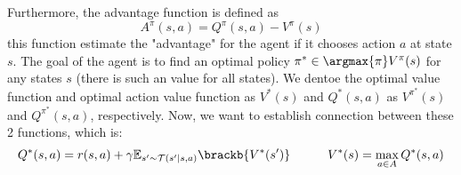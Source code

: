Furthermore, the advantage function is defined as 
\begin{equation}
    A^{\pi}(s, a) = Q^\pi(s, a) - V^\pi(s)
\end{equation}
this function estimate the "advantage" for the agent if it chooses action $a$ at state $s$.  The goal of the agent is to find an optimal policy $\pi^* \in \argmax{\pi} V^{\pi}(s)$ for any states $s$ (there is such an value for all states). We dentoe the optimal value function and optimal action value function as $V^*(s)$ and $Q^*(s, a)$ as $V^{\pi^*}(s)$ and $Q^{\pi^*}(s, a)$, respectively. Now, we want to establish connection between these 2 functions, which is:
\begin{equation}
    Q^*(s, a) = r(s, a) + \gamma \mathbb{E}_{s' \sim \mathcal{T}(s' | s, a)}\brackb{V^*(s')} \quad \quad \quad V^*(s) =\max_{a\in A} Q^*(s, a)
\end{equation}

